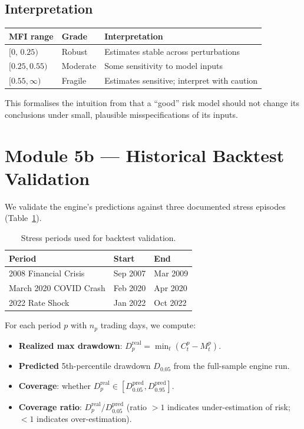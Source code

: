 \documentclass[12pt]{article}
\begin{document}
\subsection{Interpretation}

\begin{center}
\begin{tabular}{lll}
\toprule
MFI range & Grade & Interpretation \\
\midrule
$[0,\, 0.25)$ & Robust   & Estimates stable across perturbations \\
$[0.25, 0.55)$ & Moderate & Some sensitivity to model inputs \\
$[0.55, \infty)$ & Fragile  & Estimates sensitive; interpret with caution \\
\bottomrule
\end{tabular}
\end{center}

This formalises the intuition from \citet{ContDeguest2013} that a
``good'' risk model should not change its conclusions under small,
plausible misspecifications of its inputs.

\section{Module 5b — Historical Backtest Validation}

We validate the engine's predictions against three documented stress
episodes (Table~\ref{tab:backtest_periods}).

\begin{table}[h]
\centering
\caption{Stress periods used for backtest validation.}
\label{tab:backtest_periods}
\begin{tabular}{lll}
\toprule
Period & Start & End \\
\midrule
2008 Financial Crisis  & Sep 2007 & Mar 2009 \\
March 2020 COVID Crash & Feb 2020 & Apr 2020 \\
2022 Rate Shock        & Jan 2022 & Oct 2022 \\
\bottomrule
\end{tabular}
\end{table}

For each period $p$ with $n_p$ trading days, we compute:
\begin{itemize}
  \item \textbf{Realized max drawdown}: $D_p^{\text{real}} = \min_t(C_t^p - M_t^p)$.
  \item \textbf{Predicted} 5th-percentile drawdown $D_{0.05}$ from the
    full-sample engine run.
  \item \textbf{Coverage}: whether $D_p^{\text{real}} \in
    [D_{0.05}^{\text{pred}}, D_{0.95}^{\text{pred}}]$.
  \item \textbf{Coverage ratio}: $D_p^{\text{real}} / D_{0.05}^{\text{pred}}$
    (ratio $> 1$ indicates under-estimation of risk; $< 1$ indicates
    over-estimation).
\end{itemize}
\end{document}

